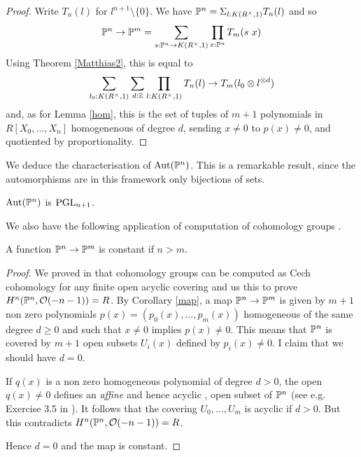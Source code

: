 \begin{proof}
Write $T_n(l)$ for $l^{n+1}\setminus\{0\}$. We have $\mathbb{P}^n = \Sigma_{l:K(R^{\times},1)}T_n(l)$ and so
$$
\mathbb{P}^n\rightarrow\mathbb{P}^m = \sum_{s:\mathbb{P}^n\rightarrow K(R^{\times},1)}\prod_{x:\mathbb{P}^n}T_m(s~x)
$$
Using Theorem \ref{Matthias2}, this is equal to
$$
\sum_{l_0:K(R^{\times},1)}\sum_{d:\mathbb{Z}}\prod_{l:K(R^{\times},1)}T_n(l)\rightarrow T_m(l_0\otimes l^{\otimes d})
$$
and, as for Lemma \ref{hom}, this is the set of tuples of $m+1$ polynomials in $R[X_0,\dots,X_n]$ homogenenous
of degree $d$, sending $x\neq 0$ to $p(x)\neq 0$, and quotiented by proportionality.
\end{proof}

We deduce the characterisation of $\mathrm{Aut}(\mathbb{P}^n)$. This is a
remarkable result, since the automorphisms are in this framework only bijections of sets.

\begin{corollary}
  $\mathrm{Aut}(\mathbb{P}^n)$ is $\operatorname{PGL}_{n+1}$.
\end{corollary}

We also have the following application of computation of cohomology groups \cite{draft}.

\begin{corollary}
A function $\mathbb{P}^n\rightarrow\mathbb{P}^m$ is constant if $n>m$.
\end{corollary}

\begin{proof}
We proved in \cite{cech-draft} that cohomology groups can be computed as Cech cohomology for any
finite open acyclic covering and us this to prove $H^n(\mathbb{P}^n,\mathcal O(-n-1))=R$.
By Corollary \ref{map}, a map $\mathbb{P}^n\rightarrow\mathbb{P}^m$ is given by $m+1$ non zero polynomials
$p(x) = (p_0(x),\dots,p_m(x))$ homogeneous of the same degree $d\geqslant 0$ and such that $x\neq 0$ implies $p(x)\neq 0$.
This means that $\mathbb{P}^n$ is covered by $m+1$ open subsets $U_i(x)$ defined by $p_i(x)\neq 0$.
I claim that we should have $d=0$.

 If $q(x)$ is a non zero homogeneous polynomial of degree $d>0$, the open $q(x)\neq 0$ defines an {\em affine}
 and hence acyclic \cite{cech-draft}, open subset of $\mathbb{P}^n$ (see e.g. Exercise 3.5 in \cite{Hartshorne}).
 It follows that the covering $U_0,\dots,U_m$ is acyclic if $d>0$. But this contradicts $H^n(\mathbb{P}^n,\mathcal O(-n-1))=R$.

 Hence $d=0$ and the map is constant.
\end{proof}
